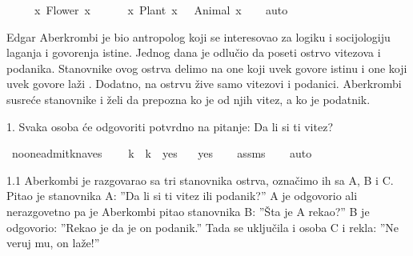 \begin{isabellebody}
\begin{exercise}[subtitle=Silogizmi]
\ \ \ \ {\isacharparenleft}{\kern0pt}{\isasymexists}\ x{\isachardot}{\kern0pt}\ Flower\ x{\isacharparenright}{\kern0pt}\ {\isasymlongrightarrow}\isanewline
\ \ \ \ {\isacharparenleft}{\kern0pt}{\isasymexists}\ x{\isachardot}{\kern0pt}\ Plant\ x\ {\isasymand}\ {\isasymnot}\ Animal\ x{\isacharparenright}{\kern0pt}{\isachardoublequoteclose}\isanewline
%
\isadelimproof
\ \ %
\endisadelimproof
%
\isatagproof
{}\isamarkupfalse%
\ auto%
\endisatagproof
{\isafoldproof}%
%
\isadelimproof
%
\endisadelimproof
%
\end{exercise}
%
\begin{exercise}[subtitle=Raymond M. Smullyan: Logical Labyrinths]
%
\begin{isamarkuptext}%
Edgar Aberkrombi je bio antropolog koji se interesovao za logiku i socijologiju
      laganja i govorenja istine. Jednog dana je odlučio da poseti ostrvo vitezova i podanika.
      Stanovnike ovog ostrva delimo na one koji uvek govore istinu  i
      one koji uvek govore laži . Dodatno, na ostrvu žive samo vitezovi i 
      podanici. Aberkrombi susreće stanovnike i želi da prepozna ko je od njih vitez, 
      a ko je podatnik.%
\end{isamarkuptext}\isamarkuptrue%
%
\begin{isamarkuptext}%
1. Svaka osoba će odgovoriti potvrdno na pitanje: Da li si ti vitez?%
\end{isamarkuptext}\isamarkuptrue%
\isamarkupfalse%
\ no{\isacharunderscore}{\kern0pt}one{\isacharunderscore}{\kern0pt}admit{\isacharunderscore}{\kern0pt}knaves{\isacharcolon}{\kern0pt}\ \isanewline
\ \ \ {\isachardoublequoteopen}k\ {\isasymlongleftrightarrow}\ {\isacharparenleft}{\kern0pt}k\ {\isasymlongleftrightarrow}\ yes{\isacharparenright}{\kern0pt}{\isachardoublequoteclose}\isanewline
\ \ \ {\isachardoublequoteopen}yes{\isachardoublequoteclose}\isanewline
%
\isadelimproof
\ \ %
\endisadelimproof
%
\isatagproof
{}\isamarkupfalse%
\ assms\isanewline
\ \ \isamarkupfalse%
\ auto%
\endisatagproof
{\isafoldproof}%
%
\isadelimproof
%
\endisadelimproof
%
\begin{isamarkuptext}%
1.1 Aberkombi je razgovarao sa tri stanovnika ostrva, označimo ih sa A, B i C. 
          Pitao je stanovnika A: ”Da li si ti vitez ili podanik?” 
          A je odgovorio ali nerazgovetno 
          pa je Aberkombi pitao stanovnika B: ”Šta je A rekao?” 
          B je odgovorio: ”Rekao je da je on podanik.” 
          Tada se uključila i osoba C i rekla: ”Ne veruj mu, on laže!” 

\end{isamarkuptext}
\end{exercise}
\end{isabellebody}

